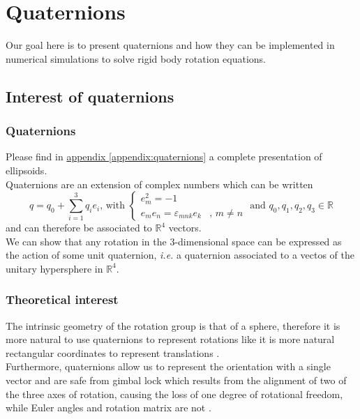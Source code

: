 \documentclass[class=report, float=false, crop=false]{standalone}
\begin{document}
\chapter{Quaternions}
\label{chap:quaternions}

Our goal here is to present quaternions and how they can be implemented in numerical simulations to solve rigid body rotation equations.

\section{Interest of quaternions}

\subsection{Quaternions}

Please find in \hyperref[appendix:quaternions]{appendix \ref{appendix:quaternions}} a complete presentation of ellipsoids.\\

Quaternions are an extension of complex numbers which can be written
\begin{equation}
q = q_0 + \sum_{i=1}^{3}q_i e_i\text{, with } \begin{cases} e_m^2 = -1& \\ e_me_n = \varepsilon_{mnk} e_k&\text{, } m \neq n \end{cases} \text{ and } q_0,q_1,q_2,q_3 \in \mathbb{R}
\end{equation}
and can therefore be associated to $\mathbb{R}^4$ vectors.\\

We can show that any rotation in the 3-dimensional space can be expressed as the action of some unit quaternion, \textit{i.e.} a quaternion associated to a vectos of the unitary hypersphere in $\mathbb{R}^4$.

\subsection{Theoretical interest}

The intrinsic geometry of the rotation group is that of a sphere, therefore it is more natural to use quaternions to represent rotations like it is more natural rectangular coordinates to represent translations \cite{shoemake1985animating}.\\

Furthermore, quaternions allow us to represent the orientation with a single vector and are safe from gimbal lock which results from the alignment of two of the three axes of rotation, causing the loss of one degree of rotational freedom, while Euler angles and rotation matrix are not \cite{munjiza2009application}.
\end{document}

